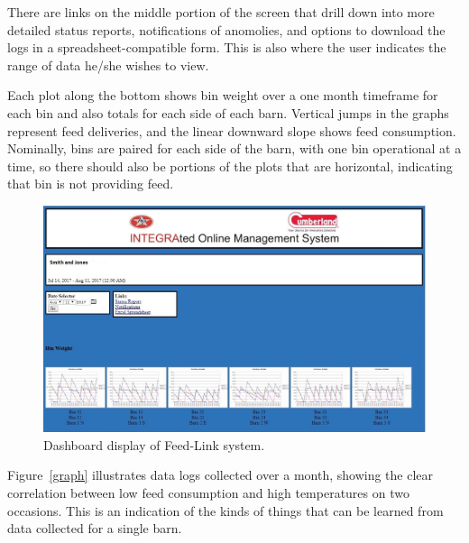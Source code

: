 There are links on the middle portion of the screen that drill down
into more detailed status reports, notifications of anomolies, and
options to download the logs in a spreadsheet-compatible form.
This is also where the user indicates the range of data he/she wishes
to view.

Each plot along the bottom shows bin weight over a one month timeframe
for each bin and also totals for each side of each barn.
Vertical jumps in the graphs represent feed deliveries, and the linear
downward slope shows feed consumption.  Nominally, bins are paired for
each side of the barn, with one bin operational at a time, so there
should also be portions of the plots that are horizontal, indicating
that bin is not providing feed.

\begin{figure}[t]
 \center
\includegraphics[width=0.9\columnwidth]{dashboard}
    \caption{Dashboard display of Feed-Link system.}
    \label{console}
\end{figure}

Figure~\ref{graph} illustrates data logs collected over a month,
showing the clear correlation between low feed consumption and
high temperatures on two occasions.
This is an indication of the kinds of things that can be
learned from data collected for a single barn.

